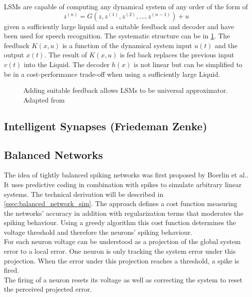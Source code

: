 \acp{LSM} are capable of computing any dynamical system of any order of the form of
\begin{equation}
	z^{(n)} = G(z,z^{(1)},z^{(2)},\dots,z^{(n-1)}) + u
\end{equation}
given a sufficiently large liquid and a suitable feedback and decoder\cite{maass_computational_2004} and have been used for speech recognition\cite{jin_performance_2017}\cite{zhang_digital_2015}. The systematic structure can be in \cref{fig:LSM_feedback}. The feedback $K(x,u)$ is a function of the dynamical system input $u(t)$ and the output $x(t)$. The result of $K(x,u)$ is fed back replaces the previous input $v(t)$ into the Liquid. The decoder $h(x)$ is not linear but can be simplified to be in a cost-performance trade-off when using a sufficiently large Liquid.\\
\begin{figure}[htbp]
	\centering
	
	\caption{Adding suitable feedback allows \acp{LSM} to be universal approximator. Adapted from \cite{maass_computational_2007}}
	\label{fig:LSM_feedback}
\end{figure}

\subsection{Intelligent Synapses (Friedeman Zenke)}

\subsection{Balanced Networks}
The idea of tightly balanced spiking networks was first proposed by Boerlin et al.\cite{boerlin_predictive_2013}. It uses predictive coding in combination with spikes to simulate arbitrary linear systems.
The technical derivation will be described in \cref{ssec:balanced_network_sim}. The approach defines a cost function measuring the networks' accuracy in addition with regularization terms that moderates the spiking behaviour. Using a greedy algorithm this cost function determines the voltage threshold and therefore the neurons' spiking behaviour.\\
For each neuron voltage can be understood as a projection of the global system error to a local error. One neuron is only tracking the system error under this projection. When the error under this projection reaches a threshold, a spike is fired.\\
The firing of a neuron resets its voltage as well as correcting the system to reset the perceived projected error.\\

